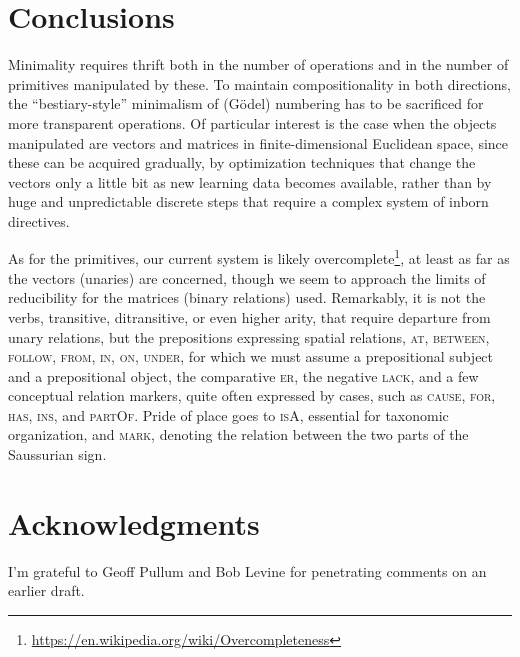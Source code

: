 \documentclass[output=paper,colorlinks=true,citecolor=brown]{langscibook}
\begin{document}
\section{Conclusions}

Minimality requires thrift both in the number of operations and in the number
of primitives manipulated by these. To maintain compositionality in both
directions, the “bestiary-style” minimalism of (Gödel) numbering has to be
sacrificed for more transparent operations. Of particular interest is the case
when the objects manipulated are vectors and matrices in finite-dimensional
Euclidean space, since these can be acquired gradually, by optimization
techniques that change the vectors only a little bit as new learning data
becomes available, rather than by huge and unpredictable discrete steps that
require a complex system of inborn directives.

As for the primitives, our current system is likely
overcomplete\footnote{\url{https://en.wikipedia.org/wiki/Overcompleteness}}, at least
as far as the vectors (unaries) are concerned, though we seem to approach the
limits of reducibility for the matrices (binary relations) used. Remarkably,
it is not the verbs, transitive, ditransitive, or even higher arity, that
require departure from unary relations, but the prepositions expressing
spatial relations, \textsc{at, between, follow, from, in, on, under,} for which we must
assume a prepositional subject and a prepositional object, the comparative
\textsc{er}, the negative \textsc{lack}, and a few conceptual relation markers,
quite often expressed by cases, such as \textsc{cause, for, has, ins}, and \textsc{partOf}. Pride of place goes to \textsc{isA}, essential for taxonomic
organization, and \textsc{mark}, denoting the relation between the two parts of
the Saussurian sign.






\section*{Acknowledgments} I'm grateful to Geoff Pullum and Bob Levine for
penetrating comments on an earlier draft.

\sloppy
\printbibliography[heading=subbibliography,notkeyword=this]
\end{document}
